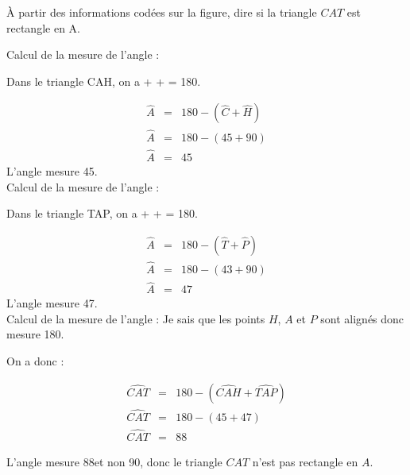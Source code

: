 	\begin{questions}
		\question[4] \`A partir des informations codées sur la figure, dire si la triangle $CAT$ est rectangle en A.
	\end{questions}
	\begin{solution}
		Calcul de la mesure de l'angle  :
		
		Dans le triangle CAH, on a  +  +  = 180\degree.
		
			\begin{eqnarray*}
				\widehat{A}  &=& 180 - (\widehat{C} + \widehat{H}) \\
				\widehat{A}  &=& 180 - (45 + 90) \\
				\widehat{A}  &=& 45
			\end{eqnarray*}
		L'angle  mesure 45\degree.\\
		
		
		
		Calcul de la mesure de l'angle  :
		
		Dans le triangle TAP, on a  +  +  = 180\degree.
		
		\begin{eqnarray*}
			\widehat{A}  &=& 180 - (\widehat{T} + \widehat{P}) \\
			\widehat{A}  &=& 180 - (43 + 90) \\
			\widehat{A}  &=& 47
		\end{eqnarray*}
		L'angle  mesure 47\degree.\\
		
		Calcul de la mesure de l'angle  :
		Je sais que les points $H$, $A$ et $P$ sont alignés donc  mesure 180\degree.
		
		On a donc :
		
		\begin{eqnarray*}
			\widehat{CAT}  &=& 180 - (\widehat{CAH} + \widehat{TAP}) \\
			\widehat{CAT}  &=& 180 - (45 + 47) \\
			\widehat{CAT}  &=& 88
		\end{eqnarray*}
	
		L'angle  mesure 88\degree et non 90\degree, donc le triangle $CAT$ n'est pas rectangle en $A$.
	\end{solution}



	
